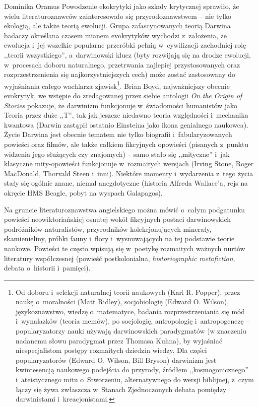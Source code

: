\begin{artplenv}{Dominika Oramus}
Powodzenie ekokrytyki jako szkoły krytycznej sprawiło, że wielu literaturoznawców zainteresowało się przyrodoznawstwem -- nie tylko ekologią, ale także teorią ewolucji. Grupa zafascynowanych teorią Darwina badaczy określana czasem mianem evokrytyków
\parencite[][s.~1–2]{boyd_origin_2010} %
 wychodzi z~założenia, że ewolucja i~jej wszelkie popularne przeróbki pełnią w~cywilizacji zachodniej rolę ,,teorii wszystkiego'', a~darwinowski klucz (byty rozwijają się na drodze ewolucji, w~procesach doboru naturalnego, przetrwania najlepiej przystosowanych oraz rozprzestrzenienia się najkorzystniejszych cech) może zostać zastosowany do wyjaśniania całego wachlarza zjawisk\footnote{Od doboru i~selekcji naturalnej teorii naukowych (Karl R. Popper), przez naukę o~moralności (Matt Ridley), socjobiologię (Edward O. Wilson), językoznawstwo, wiedzę o~matematyce, badania rozprzestrzeniania się mód i~wynalazków (teoria memów), po socjologię, antropologię i~antropogenezę -- popularyzatorzy nauki używają darwinowskich paradygmatów (w znaczeniu nadanemu słowu paradygmat przez Thomasa Kuhna), by wyjaśniać niespecjalistom postępy rozmaitych dziedzin wiedzy. Dla części popularyzatorów (Edward O. Wilson, Bill Bryson) darwinizm jest kwintesencją naukowego podejścia do przyrody, źródłem ,,kosmogonicznego'' i~ateistycznego mitu o~Stworzeniu, alternatywnego do wersji biblijnej, z~czym łączy się żywa zwłaszcza w~Stanach Zjednoczonych debata pomiędzy darwinistami i~kreacjonistami.}. Brian Boyd, najważniejszy obecnie evokrytyk, we wstępie do zredagowanej przez siebie antologii \textit{On the Origin of Stories} pokazuje, że darwinizm funkcjonuje w~świadomości humanistów jako Teoria przez duże ,,T'', tak jak jeszcze niedawno teoria względności i~mechanika kwantowa (Darwin zastąpił ostatnio Einsteina jako ikona genialnego naukowca). Życie Darwina jest obecnie tematem nie tylko biografii i~fabularyzowanych powieści oraz filmów, ale także całkiem fikcyjnych opowieści (pisanych z~punktu widzenia jego służących czy znajomych) -- samo stało się ,,mityczne'' i~jak klasyczne mity-opowieści funkcjonuje w~rozmaitych wersjach (Irving Stone, Roger MacDonald, Thorvald Steen i~inni). Niektóre momenty i~wydarzenia z~tego życia stały się ogólnie znane, niemal anegdotyczne (historia Alfreda Wallace’a, rejs na okręcie HMS Beagle, pobyt na wyspach Galapagos).

Na gruncie literaturoznawstwa angielskiego można mówić o~całym podgatunku powieści neowiktoriańskiej osnutej wokół fikcyjnych postaci darwinowskich podróżników-naturalistów, przyrodników kolekcjonujących minerały, skamienieliny, próbki fauny i~flory i~wysnuwających na tej podstawie teorie naukowe. Powieści te często wpisują się w~poetykę rozmaitych ważnych nurtów literatury współczesnej (powieść postkolonialna, \textit{historiographic metafiction}, debata o~historii i~pamięci).


\end{artplenv}
